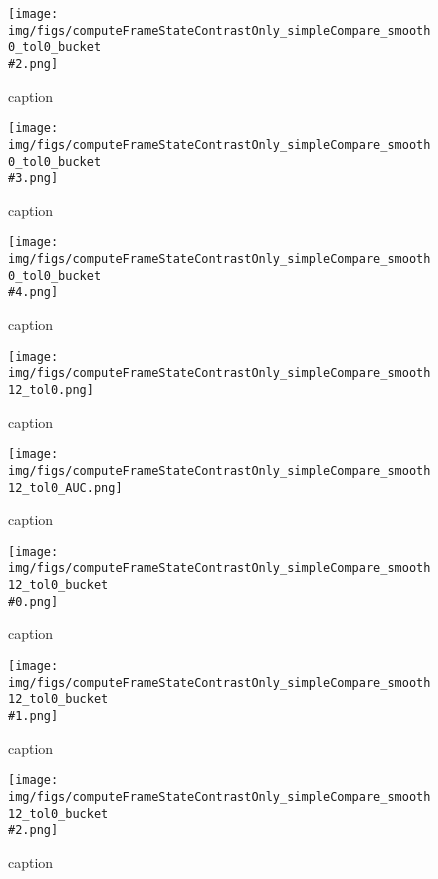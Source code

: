%
\begin{figure}[!ht]
	\centering
	\texttt{[image: img/figs/computeFrameStateContrastOnly\_simpleCompare\_smooth0\_tol0\_bucket\\\#2.png]}
	\caption{caption}
	\label{fig:computeFrameStateContrastOnly_simpleCompare_smooth0_tol0_bucket\#2.png}
\end{figure}
%
\begin{figure}[!ht]
	\centering
	\texttt{[image: img/figs/computeFrameStateContrastOnly\_simpleCompare\_smooth0\_tol0\_bucket\\\#3.png]}
	\caption{caption}
	\label{fig:computeFrameStateContrastOnly_simpleCompare_smooth0_tol0_bucket\#3.png}
\end{figure}
%
\begin{figure}[!ht]
	\centering
	\texttt{[image: img/figs/computeFrameStateContrastOnly\_simpleCompare\_smooth0\_tol0\_bucket\\\#4.png]}
	\caption{caption}
	\label{fig:computeFrameStateContrastOnly_simpleCompare_smooth0_tol0_bucket\#4.png}
\end{figure}
%
\begin{figure}[!ht]
	\centering
	\texttt{[image: img/figs/computeFrameStateContrastOnly\_simpleCompare\_smooth12\_tol0.png]}
	\caption{caption}
	\label{fig:computeFrameStateContrastOnly_simpleCompare_smooth12_tol0.png}
\end{figure}
%
\begin{figure}[!ht]
	\centering
	\texttt{[image: img/figs/computeFrameStateContrastOnly\_simpleCompare\_smooth12\_tol0\_AUC.png]}
	\caption{caption}
	\label{fig:computeFrameStateContrastOnly_simpleCompare_smooth12_tol0_AUC.png}
\end{figure}
%
\begin{figure}[!ht]
	\centering
	\texttt{[image: img/figs/computeFrameStateContrastOnly\_simpleCompare\_smooth12\_tol0\_bucket\\\#0.png]}
	\caption{caption}
	\label{fig:computeFrameStateContrastOnly_simpleCompare_smooth12_tol0_bucket\#0.png}
\end{figure}
%
\begin{figure}[!ht]
	\centering
	\texttt{[image: img/figs/computeFrameStateContrastOnly\_simpleCompare\_smooth12\_tol0\_bucket\\\#1.png]}
	\caption{caption}
	\label{fig:computeFrameStateContrastOnly_simpleCompare_smooth12_tol0_bucket\#1.png}
\end{figure}
%
\begin{figure}[!ht]
	\centering
	\texttt{[image: img/figs/computeFrameStateContrastOnly\_simpleCompare\_smooth12\_tol0\_bucket\\\#2.png]}
	\caption{caption}
	\label{fig:computeFrameStateContrastOnly_simpleCompare_smooth12_tol0_bucket\#2.png}
\end{figure}
